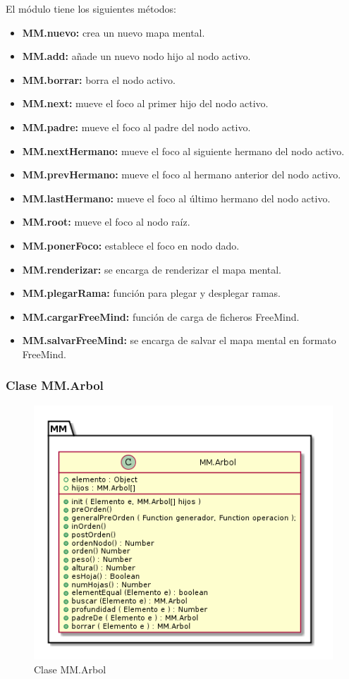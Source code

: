 El módulo tiene los siguientes métodos:
\begin{itemize}
\item \textbf{MM.nuevo:} crea un nuevo mapa mental.
\item \textbf{MM.add:} añade un nuevo nodo hijo al nodo activo.
\item \textbf{MM.borrar:} borra el nodo activo.
\item \textbf{MM.next:} mueve el foco al primer hijo del nodo activo.
\item \textbf{MM.padre:} mueve el foco al padre del nodo activo.
\item \textbf{MM.nextHermano:} mueve el foco al siguiente hermano del nodo activo.
\item \textbf{MM.prevHermano:} mueve el foco al hermano anterior del nodo activo.
\item \textbf{MM.lastHermano:} mueve el foco al último hermano del nodo activo.
\item \textbf{MM.root:} mueve el foco al nodo raíz.
\item \textbf{MM.ponerFoco:} establece el foco en nodo dado.
\item \textbf{MM.renderizar:} se encarga de renderizar el mapa mental.
\item \textbf{MM.plegarRama:} función para plegar y desplegar ramas.
\item \textbf{MM.cargarFreeMind:} función de carga de ficheros FreeMind.
\item \textbf{MM.salvarFreeMind:} se encarga de salvar el mapa mental en formato FreeMind.
\end{itemize}



\subsubsection{Clase MM.Arbol}

\begin{figure}[tbph]
\centering
\includegraphics[width=0.7\linewidth]{imagenes/diagrama-clase-mm-arbol}
\caption{Clase MM.Arbol}
\label{fig:diagrama-clase-mm-arbol}
\end{figure}

